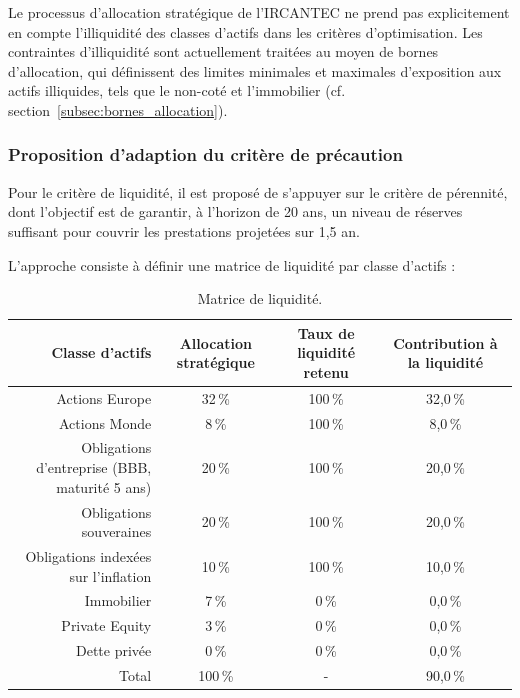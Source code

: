 \documentclass[11pt,a4paper]{article}
\renewcommand{\arraystretch}{1.4}
\newcommand{\tablehead}[1]{\textcolor{nxnavy}{\sffamily\bfseries\small #1}}
\begin{document}
Le processus d’allocation stratégique de l’IRCANTEC ne prend pas explicitement en compte l’illiquidité des classes d’actifs dans les critères d’optimisation. Les contraintes d’illiquidité sont actuellement traitées au moyen de bornes d’allocation, qui définissent des limites minimales et maximales d’exposition aux actifs illiquides, tels que le non-coté et l’immobilier (cf. section~\ref{subsec:bornes_allocation}).


\subsubsection*{Proposition d'adaption du critère de précaution}

\noindent Pour le critère de liquidité, il est proposé de s'appuyer sur le critère de pérennité, dont l'objectif est de garantir, à l'horizon de 20 ans, un niveau de réserves suffisant pour couvrir les prestations projetées sur 1,5 an.

\noindent L'approche consiste à définir une matrice de liquidité par classe d'actifs : 

\begin{table}[H]
\centering\small
\renewcommand{\arraystretch}{1.4}\setlength{\tabcolsep}{6pt}
\begin{tabularx}{\linewidth}{R C C C}
\toprule
\tablehead{Classe d'actifs} & \tablehead{Allocation stratégique} & \tablehead{Taux de liquidité retenu} & \tablehead{Contribution à la liquidité} \\
\midrule
{} Actions Europe & 32\,\% & 100\,\% & 32,0\,\% \\
Actions Monde & 8\,\% & 100\,\% & 8,0\,\% \\
 Obligations d'entreprise (BBB, maturité 5 ans) & 20\,\% & 100\,\% & 20,0\,\% \\
Obligations souveraines & 20\,\% & 100\,\% & 20,0\,\% \\
 Obligations indexées sur l'inflation & 10\,\% & 100\,\% & 10,0\,\% \\
Immobilier & 7\,\% & 0\,\% & 0,0\,\% \\
 Private Equity & 3\,\% & 0\,\% & 0,0\,\% \\
Dette privée & 0\,\% & 0\,\% & 0,0\,\% \\
\midrule
Total & 100\,\% & - & 90,0\,\% \\
\bottomrule
\end{tabularx}
\caption{Matrice de liquidité.}
\end{table}
\end{document}
